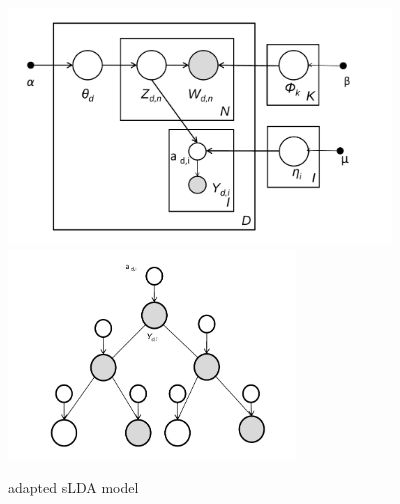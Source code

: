 \documentclass{article}
\begin{document}
%
\begin{figure}[h]
 \centering \includegraphics[width=4in]{model_1} \includegraphics[width=3in]{model_2}
\caption{adapted sLDA model}


\label{fig:example} 
\end{figure}
\end{document}
